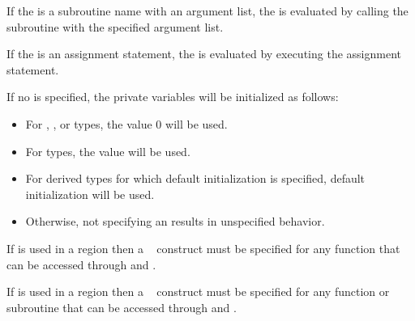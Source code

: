 \fortranspecificstart
If the  is a subroutine name with an argument list, the  is 
evaluated by calling the subroutine with the specified argument list.

If the  is an assignment statement, the  is evaluated by 
executing the assignment statement.

If no  is specified, the private variables will be initialized as follows:
\begin{itemize}
\item For , , or  types, the value 0 will be used.
\item For  types, the value  will be used.
\item For derived types for which default initialization is specified, default initialization 
will be used.
\item Otherwise, not specifying an  results in unspecified behavior.
\end{itemize}
\fortranspecificend
\bigskip

\ccppspecificstart
If  is used in a  region then a ~ construct 
must be specified for any function that can be accessed through  and 
.
\ccppspecificend
\bigskip

\fortranspecificstart
If  is used in a  region then a ~ construct 
must be specified for any function or subroutine that can be accessed through  
and .
\fortranspecificend


